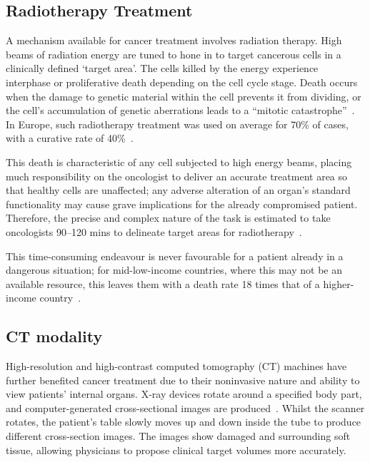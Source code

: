 \documentclass[12pt,twoside]{report}
\begin{document}
\subsection{Radiotherapy Treatment}

A mechanism available for cancer treatment involves radiation therapy. High beams of radiation energy are tuned to hone in to target cancerous cells in a clinically defined `target area'. The cells killed by the energy experience interphase or proliferative death depending on the cell cycle stage. Death occurs when the damage to genetic material within the cell prevents it from dividing, or the cell's accumulation of genetic aberrations leads to a ``mitotic catastrophe''~\cite{cell-death}. In Europe, such radiotherapy treatment was used on average for 70\% of cases, with a curative rate of 40\%~\cite{radiotherapy-advances, Thompson2018}.

This death is characteristic of any cell subjected to high energy beams, placing much responsibility on the oncologist to deliver an accurate treatment area so that healthy cells are unaffected; any adverse alteration of an organ's standard functionality may cause grave implications for the already compromised patient. Therefore, the precise and complex nature of the task is estimated to take oncologists 90--120 mins to delineate target areas for radiotherapy~\cite{LIU2020184}.

This time-consuming endeavour is never favourable for a patient already in a dangerous situation; for mid-low-income countries, where this may not be an available resource, this leaves them with a death rate 18 times that of a higher-income country~\cite{cervical-cancer-epidemic}. 

\subsection{CT modality}\label{sect:ct-modality}

High-resolution and high-contrast computed tomography (CT) machines have further benefited cancer treatment due to their noninvasive nature and ability to view patients' internal organs. X-ray devices rotate around a specified body part, and computer-generated cross-sectional images are produced~\cite{file-formats}. Whilst the scanner rotates, the patient's table slowly moves up and down inside the tube to produce different cross-section images. The images show damaged and surrounding soft tissue, allowing physicians to propose clinical target volumes more accurately.
\end{document}
